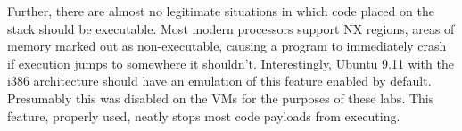Further, there are almost no legitimate situations in which code placed on the stack should be executable. Most modern
processors support NX regions, areas of memory marked out as non-executable, causing a program to immediately crash if
execution jumps to somewhere it shouldn't. Interestingly, Ubuntu 9.11 with the i386 architecture should have an
emulation of this feature enabled by default. %
Presumably this was disabled on the VMs for the purposes of these labs. This feature, properly used, neatly stops most
code payloads from executing.


